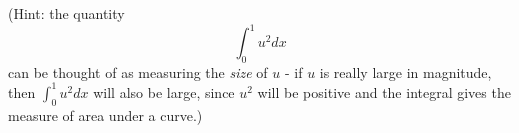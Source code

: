 \begin{enumerate}
\vspace{1em}

(Hint: the quantity
\[
\int_0^1 u^2 dx
\]
can be thought of as measuring the \emph{size} of $u$ - if $u$ is really large in magnitude, then $\int_0^1 u^2 dx$ will also be large, since $u^2$ will be positive and the integral gives the measure of area under a curve.)  
%
%
%
\end{enumerate}


